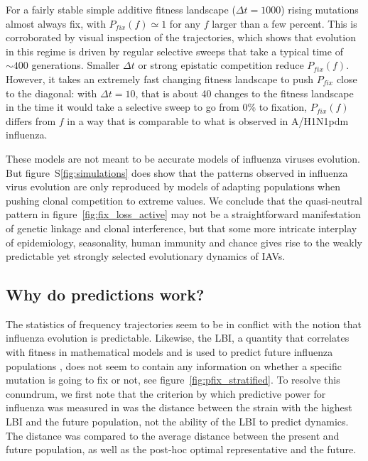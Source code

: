 \documentclass[reprint,amsmath,amssymb,superscriptaddress,showpacs,rmp]{revtex4-1}
\newcommand{\sref}[1]{S\ref{#1}}
\begin{document}
For a fairly stable simple additive fitness landscape ($\Delta t=1000$) rising mutations almost always fix, with $P_{fix}(f)\simeq 1$ for any $f$ larger than a few percent.
This is corroborated by visual inspection of the trajectories, which shows that evolution in this regime is driven by regular selective sweeps that take a typical time of $\sim 400$ generations.
Smaller $\Delta t$ or strong epistatic competition reduce $P_{fix}(f)$.
However, it takes an extremely fast changing fitness landscape to push $P_{fix}$ close to the diagonal: with $\Delta t=10$, that is about 40 changes to the fitness landscape in the time it would take a selective sweep to go from 0\% to fixation, $P_{fix}(f)$ differs from $f$ in a way that is comparable to what is observed in A/H1N1pdm influenza.

These models are not meant to be accurate models of influenza viruses evolution.
But figure~\sref{fig:simulations} does show that the patterns observed in influenza virus evolution are only reproduced by models of adapting populations when pushing clonal competition to extreme values.
We conclude that the quasi-neutral pattern in figure~\ref{fig:fix_loss_active} may not be a straightforward manifestation of genetic linkage and clonal interference, but that some more intricate interplay of epidemiology, seasonality, human immunity and chance gives rise to the weakly predictable yet strongly selected evolutionary dynamics of IAVs.

\subsection*{Why do predictions work?}
The statistics of frequency trajectories seem to be in conflict with the notion that influenza evolution is predictable.
Likewise, the LBI, a quantity that correlates with fitness in mathematical models and is used to predict future influenza populations \citep{neher_predicting_2014}, does not seem to contain any information on whether a specific mutation is going to fix or not, see figure~\ref{fig:pfix_stratified}.
To resolve this conundrum, we first note that the criterion by which predictive power for influenza was measured in \citep{neher_predicting_2014} was the distance between the strain with the highest LBI and the future population, not the ability of the LBI to predict dynamics.
The distance was compared to the average distance between the present and future population, as well as the post-hoc optimal representative and the future.
\end{document}
